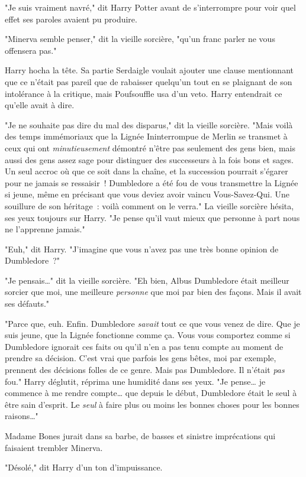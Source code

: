 "Je suis vraiment navré," dit Harry Potter avant de s'interrompre pour voir quel effet ses paroles avaient pu produire.

"Minerva semble penser," dit la vieille sorcière, "qu'un franc parler ne vous offensera pas."

Harry hocha la tête. Sa partie Serdaigle voulait ajouter une clause mentionnant que ce n'était pas pareil que de rabaisser quelqu'un tout en se plaignant de son intolérance à la critique, mais Poufsouffle usa d'un veto. Harry entendrait ce qu'elle avait à dire.

"Je ne souhaite pas dire du mal des disparus," dit la vieille sorcière. "Mais voilà des temps immémoriaux que la Lignée Ininterrompue de Merlin se transmet à ceux qui ont \emph{minutieusement} démontré n'être pas seulement des gens bien, mais aussi des gens assez sage pour distinguer des successeurs à la fois bons et sages. Un seul accroc où que ce soit dans la chaîne, et la succession pourrait s'égarer pour ne jamais se ressaisir~! Dumbledore a été fou de vous transmettre la Lignée si jeune, même en précisant que vous deviez avoir vaincu Vous-Savez-Qui. Une souillure de son héritage~: voilà comment on le verra." La vieille sorcière hésita, ses yeux toujours sur Harry. "Je pense qu'il vaut mieux que personne à part nous ne l'apprenne jamais."

"Euh," dit Harry. "J'imagine que vous n'avez pas une très bonne opinion de Dumbledore~?"

"Je pensais…" dit la vieille sorcière. "Eh bien, Albus Dumbledore était meilleur sorcier que moi, une meilleure \emph{personne} que moi par bien des façons. Mais il avait ses défauts."

"Parce que, euh. Enfin. Dumbledore \emph{savait} tout ce que vous venez de dire. Que je suis jeune, que la Lignée fonctionne comme ça. Vous vous comportez comme si Dumbledore ignorait ces faits ou qu'il n'en a pas tenu compte au moment de prendre sa décision. C'est vrai que parfois les gens bêtes, moi par exemple, prennent des décisions folles de ce genre. Mais pas Dumbledore. Il n'était \emph{pas} fou." Harry déglutit, réprima une humidité dans ses yeux. "Je pense… je commence à me rendre compte… que depuis le début, Dumbledore était le seul à être sain d'esprit. Le \emph{seul} à faire plus ou moins les bonnes choses pour les bonnes raisons…"

Madame Bones jurait dans sa barbe, de basses et sinistre imprécations qui faisaient trembler Minerva.

"Désolé," dit Harry d'un ton d'impuissance.

